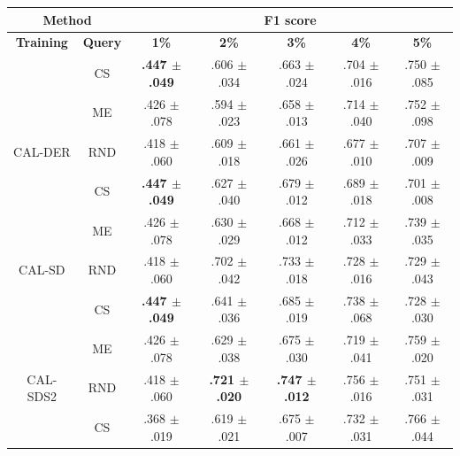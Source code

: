 \begin{table}[htbp]
\centering

\begin{tabular*}{\linewidth}{c|c|@{\extracolsep{\fill}}ccccc}
\toprule
\multicolumn{2}{c|}{\textbf{Method}} & \multicolumn{5}{c}{\textbf{F1 score}} \\
\midrule
\textbf{Training} & \textbf{Query} & \textbf{1\%} & \textbf{2\%} & \textbf{3\%} & \textbf{4\%} & \textbf{5\%}\\
\midrule
 & CS & \textbf{.447 $\pm$ {\small .049}} & .606 $\pm$ {\small .034} & .663 $\pm$ {\small .024} & .704 $\pm$ {\small .016} & .750 $\pm$ {\small .085}\\

 & ME & .426 $\pm$ {\small .078} & .594 $\pm$ {\small .023} & .658 $\pm$ {\small .013} & .714 $\pm$ {\small .040} & .752 $\pm$ {\small .098}\\

\multirow{-3}{*}{\raggedright\arraybackslash CAL-DER} & RND & .418 $\pm$ {\small .060} & .609 $\pm$ {\small .018} & .661 $\pm$ {\small .026} & .677 $\pm$ {\small .010} & .707 $\pm$ {\small .009}\\
\midrule
 & CS & \textbf{.447 $\pm$ {\small .049}} & .627 $\pm$ {\small .040} & .679 $\pm$ {\small .012} & .689 $\pm$ {\small .018} & .701 $\pm$ {\small .008}\\

 & ME & .426 $\pm$ {\small .078} & .630 $\pm$ {\small .029} & .668 $\pm$ {\small .012} & .712 $\pm$ {\small .033} & .739 $\pm$ {\small .035}\\

\multirow{-3}{*}{\raggedright\arraybackslash CAL-SD} & RND & .418 $\pm$ {\small .060} & .702 $\pm$ {\small .042} & .733 $\pm$ {\small .018} & .728 $\pm$ {\small .016} & .729 $\pm$ {\small .043}\\
\midrule
 & CS & \textbf{.447 $\pm$ {\small .049}} & .641 $\pm$ {\small .036} & .685 $\pm$ {\small .019} & .738 $\pm$ {\small .068} & .728 $\pm$ {\small .030}\\

 & ME & .426 $\pm$ {\small .078} & .629 $\pm$ {\small .038} & .675 $\pm$ {\small .030} & .719 $\pm$ {\small .041} & .759 $\pm$ {\small .020}\\

\multirow{-3}{*}{\raggedright\arraybackslash CAL-SDS2} & RND & .418 $\pm$ {\small .060} & \textbf{.721 $\pm$ {\small .020}} & \textbf{.747 $\pm$ {\small .012}} & .756 $\pm$ {\small .016} & .751 $\pm$ {\small .031}\\
\midrule
 & CS & .368 $\pm$ {\small .019} & .619 $\pm$ {\small .021} & .675 $\pm$ {\small .007} & .732 $\pm$ {\small .031} & .766 $\pm$ {\small .044}\\


\end{tabular*}
\end{table}
